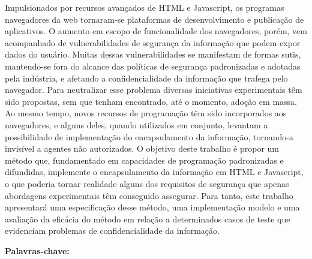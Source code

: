 \newpage
\begin{resumo}
\normalsize

Impulsionados por recursos avançados de HTML e Javascript, os programas navegadores da web tornaram-se plataformas de desenvolvimento e publicação de aplicativos. O aumento em escopo de funcionalidade dos navegadores, porém, vem acompanhado de vulnerabilidades de segurança da informação que podem expor dados do usuário. Muitas dessas vulnerabilidades se manifestam de formas sutis, mantendo-se fora do alcance das políticas de segurança padronizadas e adotadas pela indústria, e afetando a confidencialidade da informação que trafega pelo navegador. Para neutralizar esse problema diversas iniciativas experimentais têm sido propostas, sem que tenham encontrado, até o momento, adoção em massa. Ao mesmo tempo, novos recursos de programação têm sido incorporados aos navegadores, e alguns deles, quando utilizados em conjunto, levantam a possibilidade de implementação do encapsulamento da informação, tornando-a invisível a agentes não autorizados. O objetivo deste trabalho é propor um método que, fundamentado em capacidades de programação padronizadas e difundidas, implemente o encapsulamento da informação em HTML e Javascript, o que poderia tornar realidade alguns dos requisitos de segurança que apenas abordagens experimentais têm conseguido assegurar. Para tanto, este trabalho apresentará uma especificação desse método, uma implementação modelo e uma avaliação da eficácia do método em relação a determinados casos de teste que evidenciam problemas de confidencialidade da informação.

\vspace{\onelineskip}

\noindent
\textbf{Palavras-chave:} \imprimirpalavraschave
\end{resumo}

